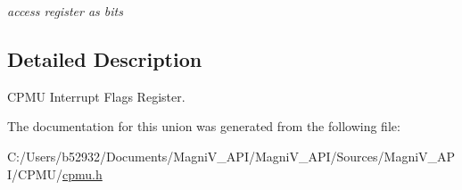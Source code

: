 \begin{DoxyCompactItemize}
\begin{tabbing}
\end{tabbing}\begin{DoxyCompactList}\small\item\em access register as bits \end{DoxyCompactList}\end{DoxyCompactItemize}


\subsection{Detailed Description}
C\+P\+M\+U Interrupt Flags Register. 

The documentation for this union was generated from the following file\+:\begin{DoxyCompactItemize}
\item 
C\+:/\+Users/b52932/\+Documents/\+Magni\+V\+\_\+\+A\+P\+I/\+Magni\+V\+\_\+\+A\+P\+I/\+Sources/\+Magni\+V\+\_\+\+A\+P\+I/\+C\+P\+M\+U/\hyperlink{cpmu_8h}{cpmu.\+h}\end{DoxyCompactItemize}
